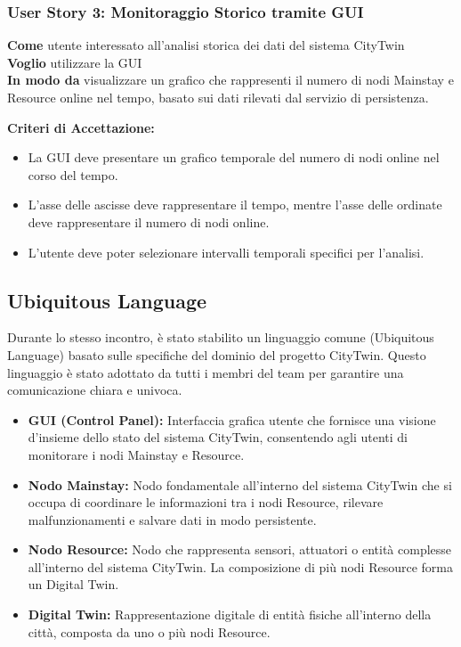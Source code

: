 \subsubsection{User Story 3: Monitoraggio Storico tramite GUI}

\textbf{Come} utente interessato all'analisi storica dei dati del sistema CityTwin \\
\textbf{Voglio} utilizzare la GUI \\
\textbf{In modo da} visualizzare un grafico che rappresenti il numero di nodi Mainstay e Resource online nel tempo, basato sui dati rilevati dal servizio di persistenza.

\textbf{Criteri di Accettazione:}
\begin{itemize}
    \item La GUI deve presentare un grafico temporale del numero di nodi online nel corso del tempo.
    \item L'asse delle ascisse deve rappresentare il tempo, mentre l'asse delle ordinate deve rappresentare il numero di nodi online.
    \item L'utente deve poter selezionare intervalli temporali specifici per l'analisi.
\end{itemize}

\subsection{Ubiquitous Language}

Durante lo stesso incontro, è stato stabilito un linguaggio comune (Ubiquitous Language) basato sulle specifiche del dominio del progetto CityTwin. Questo linguaggio è stato adottato da tutti i membri del team per garantire una comunicazione chiara e univoca.

\begin{itemize}
    \item \textbf{GUI (Control Panel):} Interfaccia grafica utente che fornisce una visione d'insieme dello stato del sistema CityTwin, consentendo agli utenti di monitorare i nodi Mainstay e Resource.

    \item \textbf{Nodo Mainstay:} Nodo fondamentale all'interno del sistema CityTwin che si occupa di coordinare le informazioni tra i nodi Resource, rilevare malfunzionamenti e salvare dati in modo persistente.

    \item \textbf{Nodo Resource:} Nodo che rappresenta sensori, attuatori o entità complesse all'interno del sistema CityTwin. La composizione di più nodi Resource forma un Digital Twin.

    \item \textbf{Digital Twin:} Rappresentazione digitale di entità fisiche all'interno della città, composta da uno o più nodi Resource.

\end{itemize}

